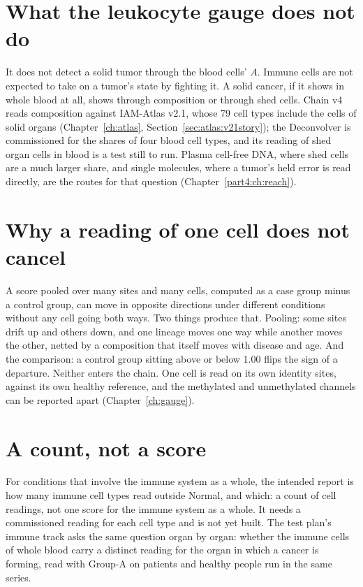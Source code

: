 \section{What the leukocyte gauge does not do}

It does not detect a solid tumor through the blood cells' $A$. Immune cells are not expected to take on a tumor's state by fighting it. \conjecture{} A solid cancer, if it shows in whole blood at all, shows through composition or through shed cells. Chain v4 reads composition against IAM-Atlas v2.1, whose 79 cell types include the cells of solid organs (Chapter~\ref{ch:atlas}, Section~\ref{sec:atlas:v21story}); the Deconvolver is commissioned for the shares of four blood cell types, and its reading of shed organ cells in blood is a test still to run. Plasma cell-free DNA, where shed cells are a much larger share, and single molecules, where a tumor's held error is read directly, are the
routes for that question (Chapter~\ref{part4:ch:reach}).

\section{Why a reading of one cell does not cancel}

A score pooled over many sites and many cells, computed as a case group minus a control group, can move in opposite directions under different conditions without any cell going
both ways. Two things produce that. Pooling: some sites drift up and others down, and one lineage moves one way while another moves the other, netted by a composition that itself
moves with disease and age. And the comparison: a control group sitting above or below 1.00 flips the sign of a departure. Neither enters the chain. One cell is read on its own
identity sites, against its own healthy reference, and the methylated and unmethylated channels can be reported apart (Chapter~\ref{ch:gauge}).

\section{A count, not a score}

For conditions that involve the immune system as a whole, the intended report is how many immune cell types read outside Normal, and which: a count of cell readings, not one score
for the immune system as a whole. It needs a commissioned reading for each cell type and is not yet built. \openprob{} The test plan's immune track asks the same question organ by organ: whether the immune cells of whole blood carry a distinct reading for the organ in which a cancer is forming, read with Group-A on patients and healthy people run in the same series.
